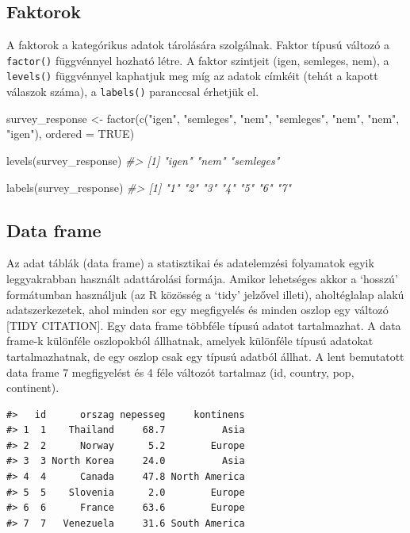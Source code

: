 \documentclass[
]{book}
\newenvironment{Shaded}{\begin{snugshade}}{\end{snugshade}}
\newcommand{\AttributeTok}[1]{\textcolor[rgb]{0.77,0.63,0.00}{#1}}
\newcommand{\CommentTok}[1]{\textcolor[rgb]{0.56,0.35,0.01}{\textit{#1}}}
\newcommand{\ConstantTok}[1]{\textcolor[rgb]{0.00,0.00,0.00}{#1}}
\newcommand{\FunctionTok}[1]{\textcolor[rgb]{0.00,0.00,0.00}{#1}}
\newcommand{\NormalTok}[1]{#1}
\newcommand{\OtherTok}[1]{\textcolor[rgb]{0.56,0.35,0.01}{#1}}
\newcommand{\StringTok}[1]{\textcolor[rgb]{0.31,0.60,0.02}{#1}}
\begin{document}
\hypertarget{faktorok}{%
\subsection{Faktorok}\label{faktorok}}

A faktorok a kategórikus adatok tárolására szolgálnak. Faktor típusú
változó a \texttt{factor()} függvénnyel hozható létre. A faktor
szintjeit (igen, semleges, nem), a \texttt{levels()} függvénnyel
kaphatjuk meg míg az adatok címkéit (tehát a kapott válaszok száma), a
\texttt{labels()} paranccsal érhetjük el.

\begin{Shaded}
\begin{Highlighting}[]
\NormalTok{survey\_response }\OtherTok{\textless{}{-}} \FunctionTok{factor}\NormalTok{(}\FunctionTok{c}\NormalTok{(}\StringTok{"igen"}\NormalTok{, }\StringTok{"semleges"}\NormalTok{, }\StringTok{"nem"}\NormalTok{, }\StringTok{"semleges"}\NormalTok{, }\StringTok{"nem"}\NormalTok{, }\StringTok{"nem"}\NormalTok{, }\StringTok{"igen"}\NormalTok{), }\AttributeTok{ordered =} \ConstantTok{TRUE}\NormalTok{)}


\FunctionTok{levels}\NormalTok{(survey\_response)}
\CommentTok{\#\textgreater{} [1] "igen"     "nem"      "semleges"}

\FunctionTok{labels}\NormalTok{(survey\_response)}
\CommentTok{\#\textgreater{} [1] "1" "2" "3" "4" "5" "6" "7"}
\end{Highlighting}
\end{Shaded}

\hypertarget{data-frame}{%
\subsection{Data frame}\label{data-frame}}

Az adat táblák (data frame) a statisztikai és adatelemzési folyamatok
egyik leggyakrabban használt adattárolási formája. Amikor lehetséges
akkor a `hosszú' formátumban használjuk (az R közösség a `tidy' jelzővel
illeti), aholtéglalap alakú adatszerkezetek, ahol minden sor egy
megfigyelés és minden oszlop egy változó {[}TIDY CITATION{]}. Egy data
frame többféle típusú adatot tartalmazhat. A data frame-k különféle
oszlopokból állhatnak, amelyek különféle típusú adatokat
tartalmazhatnak, de egy oszlop csak egy típusú adatból állhat. A lent
bemutatott data frame 7 megfigyelést és 4 féle változót tartalmaz (id,
country, pop, continent).

\begin{verbatim}
#>   id      orszag nepesseg     kontinens
#> 1  1    Thailand     68.7          Asia
#> 2  2      Norway      5.2        Europe
#> 3  3 North Korea     24.0          Asia
#> 4  4      Canada     47.8 North America
#> 5  5    Slovenia      2.0        Europe
#> 6  6      France     63.6        Europe
#> 7  7   Venezuela     31.6 South America
\end{verbatim}
\end{document}
